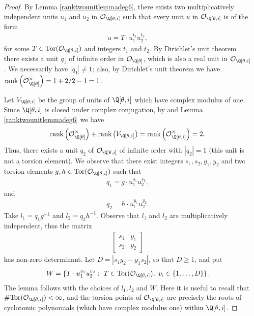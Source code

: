 \documentclass[12pt]{amsart}
\newcommand{\1}{\mathmybb{1}}
\begin{document}
\begin{proof}
By Lemma \ref{ranktwounitlemmadeg6}, there exists two multiplicatively independent units $u_{1}$ and $u_{2}$ in $\mathcal{O}_{\Q[\theta,i]}$ such that every unit $u$ in $\mathcal{O}_{\Q[\theta,i]}$ is of the form
\begin{align*}
u= T \cdot u_{1}^{t_{1}}u_{2}^{t_{2}},
\end{align*}
for some $T \in \text{Tor}(\mathcal{O}_{\Q[\theta,i]})$ and integers $t_{1}$ and $t_{2}$. By Dirichlet's unit theorem there exists a unit $q_{1}$ of infinite order in $\mathcal{O}_{\Q[\theta]}$, which is also a real unit in $\mathcal{O}_{\Q[\theta,i]}$. We necessarily have $|q_{1}| \neq 1$; also, by Dirichlet's unit theorem we have $\text{rank}\left(\mathcal{O}_{\Q[\theta]}^{\times}\right) = 1 + 2/2 - 1 = 1$.

Let $V_{\Q[\theta,i]}$ be the group of units of $\Q[\theta,i]$ which have complex modulus of one. Since $\Q[\theta,i]$ is closed under complex conjugation, by \cite[Theorem 1]{Daileda} and Lemma \ref{ranktwounitlemmadeg6} we have
\begin{align*}
\text{rank}\left(\mathcal{O}_{\Q[\theta]}^{\times}\right)+\text{rank}\left(V_{\Q[\theta,i]}\right) = \text{rank}\left(\mathcal{O}_{\Q[\theta,i]}^{\times}\right) = 2.
\end{align*}
Thus, there exists a unit $q_{2}$ of $\mathcal{O}_{\Q[\theta,i]}$ of infinite order with $|q_{2}| = 1$ (this unit is not a torsion element). We observe that there exist integers $s_{1},s_{2},y_{1},y_{2}$ and two torsion elements $g,h \in \text{Tor}(\mathcal{O}_{\Q[\theta,i]})$ such that
\begin{align*}
q_{1} = g \cdot u_{1}^{s_{1}}u_{2}^{s_{2}},
\end{align*}
and
\begin{align*}
q_{2} = h \cdot u_{1}^{y_{1}}u_{2}^{y_{2}}.
\end{align*}
Take $l_{1} = q_{1}g^{-1}$ and $l_{2} = q_{2}h^{-1}$. Observe that $l_{1}$ and $l_{2}$ are multiplicatively independent, thus the matrix 
\begin{align*}
\begin{bmatrix}
s_{1} & y_{1}\\
s_{2} & y_{2}
\end{bmatrix}
\end{align*}
has non-zero determinant. Let $D = |s_{1}y_{2}-y_{1}s_{2}|$, so that $D \geq 1$, and put
\begin{align*}
W = \{T\cdot u_{1}^{v_{1}}u_{2}^{v_{2}}: \ T\in \text{Tor}(\mathcal{O}_{\Q[\theta,i]}), \ v_{i} \in \{1,\ldots,D\}\}.
\end{align*}
The lemma follows with the choices of $l_{1},l_{2}$ and $W$. Here it is useful to recall that $\#\text{Tor}(\mathcal{O}_{\Q[\theta,i]}) < \infty$, and the torsion points of $\mathcal{O}_{\Q[\theta,i]}$ are precisely the roots of cyclotomic polynomials (which have complex modulus one) within $\Q[\theta,i]$.
\end{proof}
\end{document}
